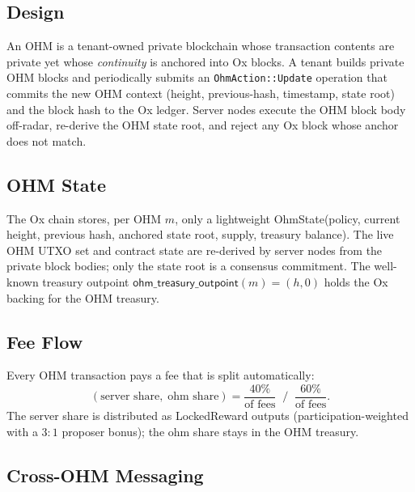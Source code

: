 \documentclass[11pt,a4paper]{article}
\theoremstyle{definition}
\newcommand{\ox}{\textsf{Ox}}
\newcommand{\ohm}{\textsf{OH\scriptsize M}}\newcommand{\evk}{\textsf{EVK}}
\newcommand{\LockedReward}{\textsf{LockedReward}}
\newcommand{\OhmState}{\textsf{OhmState}}
\begin{document}
\subsection{Design}

An \ohm{} is a tenant-owned private blockchain whose transaction contents are
private yet whose \emph{continuity} is anchored into \ox{} blocks.  A tenant
builds private \ohm{} blocks and periodically submits an
\texttt{OhmAction::Update} operation that commits the new OHM context
(height, previous-hash, timestamp, state root) and the block hash to the \ox{}
ledger.  Server nodes execute the OHM block body off-radar, re-derive the
OHM state root, and reject any \ox{} block whose anchor does not match.

\subsection{OHM State}

The Ox chain stores, per \ohm{} $m$, only a lightweight \OhmState (policy, current
height, previous hash, anchored state root, supply, treasury balance).  The
live OHM UTXO set and contract state are re-derived by server nodes from the
private block bodies; only the state root is a consensus commitment.  The well-known
treasury outpoint $\mathsf{ohm\_treasury\_outpoint}(m) = (h, 0)$ holds the
\ox{} backing for the OHM treasury.

\subsection{Fee Flow}

Every \ohm{} transaction pays a fee that is split automatically:
\[
(\text{server share},\; \text{ohm share}) =
\textstyle\frac{40\%}{\text{of fees}}\;\;/\;\;\frac{60\%}{\text{of fees}}.
\]
The server share is distributed as \LockedReward{} outputs (participation-weighted
with a $3{:}1$ proposer bonus); the ohm share stays in the OHM treasury.

\subsection{Cross-OHM Messaging}
\label{sec:xoh}
\end{document}
